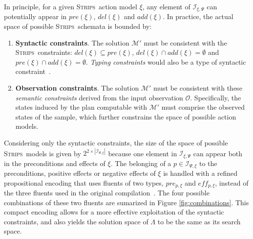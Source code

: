 \documentclass[runningheads]{llncs}
\newcommand{\strips}{\textsc{Strips}}     %
\begin{document}
In principle, for a given \strips\ action model $\xi$, any element of ${\mathcal I}_{\xi,\Psi}$ can potentially appear in $pre(\xi)$, $del(\xi)$ and $add(\xi)$. In practice, the actual space of possible \strips\ schemata is bounded by:
\begin{enumerate}
\item {\bf Syntactic constraints}. The solution $\mathcal{M}'$ must be consistent with the \strips\ constraints: $del(\xi)\subseteq pre(\xi)$, $del(\xi)\cap add(\xi)=\emptyset$ and $pre(\xi)\cap add(\xi)=\emptyset$. {\em Typing constraints} would also be a type of syntactic constraint~\cite{mcdermott1998pddl}.
\item {\bf Observation constraints}. The solution $\mathcal{M}'$ must be consistent with these \emph{semantic constraints} derived from the input observation $\mathcal{O}$. Specifically, the states induced by the plan computable with $\mathcal{M}'$ must comprise the observed states of the sample, which further constrains the space of possible action models.
\end{enumerate}

Considering only the syntactic constraints, the size of the space of possible \strips\ models is given by $2^{2\times|{\mathcal I}_{\Psi,\xi}|}$ because one element in $\mathcal{I}_{\xi,\Psi}$ can appear both in the preconditions and effects of $\xi$. The belonging of a $p \in \mathcal{I}_{\Psi,\xi}$ to the preconditions, positive effects or negative effects of $\xi$ is handled with a refined propositional encoding that uses fluents of two types, $pre_{p,\xi}$ and $eff_{p,\xi}$, instead of the three fluents used in the original compilation~\cite{aineto2018learning}. The four possible combinations of these two fluents are sumarized in Figure \ref{fig:combinations}. This compact encoding allows for a more effective exploitation of the syntactic constraints, and also yields the solution space of $\Lambda$ to be the same as its search space.
\end{document}
